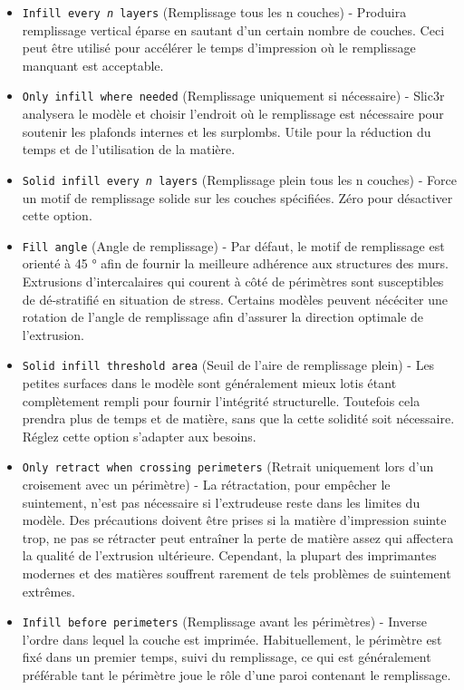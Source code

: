 \begin{itemize}
    \item \texttt{Infill every \textit{n} layers} (Remplissage tous les n couches) - Produira remplissage vertical \'eparse en sautant d'un certain nombre de couches. Ceci peut \^etre utilis\'e pour acc\'el\'erer le temps d'impression o\`u le remplissage manquant est acceptable.
    \item \texttt{Only infill where needed} (Remplissage uniquement si n\'ecessaire) - Slic3r analysera le mod\`ele et choisir l'endroit o\`u le remplissage est n\'ecessaire pour soutenir les plafonds internes et les surplombs. Utile pour la r\'eduction du temps et de l'utilisation de la mati\`ere.
    \item \texttt{Solid infill every \textit{n} layers} (Remplissage plein tous les n couches) - Force un motif de remplissage solide sur les couches sp\'ecifi\'ees. Z\'ero pour d\'esactiver cette option.
    \item \texttt{Fill angle} (Angle de remplissage) - Par d\'efaut, le motif de remplissage est orient\'e \`a 45 ° afin de fournir la meilleure adh\'erence aux structures des murs. Extrusions d'intercalaires qui courent \`a c\^ot\'e de p\'erim\`etres sont susceptibles de d\'e-stratifi\'e en situation de stress. Certains mod\`eles peuvent n\'ec\'eciter une rotation de l'angle de remplissage afin d'assurer la direction optimale de l'extrusion.
    \item \texttt{Solid infill threshold area} (Seuil de l'aire de remplissage plein) - Les petites surfaces dans le mod\`ele sont g\'en\'eralement mieux lotis \'etant compl\`etement rempli pour fournir l'int\'egrit\'e structurelle. Toutefois cela prendra plus de temps et de mati\`ere, sans que la cette solidit\'e soit n\'ecessaire. R\'eglez cette option s'adapter aux besoins.
    \item \texttt{Only retract when crossing perimeters} (Retrait uniquement lors d'un croisement avec un p\'erim\`etre) - La r\'etractation, pour emp\^echer le suintement, n'est pas n\'ecessaire si l'extrudeuse reste dans les limites du mod\`ele. Des pr\'ecautions doivent \^etre prises si la mati\`ere d'impression suinte trop, ne pas se r\'etracter peut entra\^iner la perte de mati\`ere assez qui affectera la qualit\'e de l'extrusion ult\'erieure. Cependant, la plupart des imprimantes modernes et des mati\`eres souffrent rarement de tels probl\`emes de suintement extr\^emes.
    \item \texttt{Infill before perimeters} (Remplissage avant les p\'erim\`etres) - Inverse l'ordre dans lequel la couche est imprim\'ee. Habituellement, le p\'erim\`etre est fix\'e dans un premier temps, suivi du remplissage, ce qui est g\'en\'eralement pr\'ef\'erable tant le p\'erim\`etre joue le r\^ole d'une paroi contenant le remplissage.
\end{itemize}


